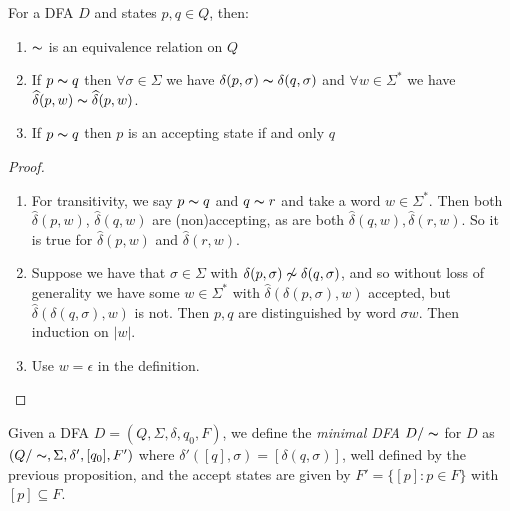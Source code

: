 \documentclass[10pt,a4paper]{article}
\begin{document}
\begin{proposition}
For a DFA $D$ and states $p,q \in Q$, then:
\begin{enumerate}
\item $\thicksim$ is an equivalence relation on $Q$
\item If $p \thicksim q$ then $\forall \sigma \in \Sigma$ we have $\delta(p, \sigma) \thicksim \delta(q, \sigma)$ and $\forall w \in \Sigma^{\ast}$ we have $\hat{\delta}(p,w) \thicksim \hat{\delta}(p,w)$.
\item If $p \thicksim q$ then $p$ is an accepting state if and only $q$
\end{enumerate}
\end{proposition}
\begin{proof}
\item
\begin{enumerate}
\item For transitivity, we say $p \thicksim q$ and $q \thicksim r$ and take a word $w \in \Sigma^{\ast}$. Then both $\hat{\delta}(p,w)$, $\hat{\delta}(q,w)$ are (non)accepting, as are both $\hat{\delta}(q,w), \hat{\delta}(r,w)$. So it is true for $\hat{\delta}(p,w)$ and $\hat{\delta}(r,w)$.
\item Suppose we have that $\sigma \in \Sigma$ with $\delta(p,\sigma) \not\thicksim \delta(q, \sigma)$, and so  without loss of generality we have some $w \in \Sigma^{\ast}$ with $\hat{\delta}(\delta(p,\sigma),w)$ accepted, but $\hat{\delta}(\delta(q, \sigma), w)$ is not. Then $p,q$ are distinguished by word $\sigma w$. Then induction on $|w|$.

\item Use $w = \epsilon$ in the definition.
\end{enumerate}
\end{proof}
Given a DFA $D = (Q, \Sigma, \delta, q_0, F)$, we define the \emph{minimal DFA} $D/\thicksim$ for $D$ as $(Q/\thicksim, \Sigma, \delta', [q_0], F')$ where $\delta'([q],\sigma) = [\delta(q,\sigma)]$, well defined by the previous proposition, and the accept states are given by $F' = \{[p]: p\in F\}$ with $[p] \subseteq F$.
\end{document}
